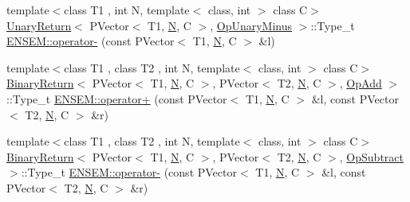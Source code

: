 \begin{DoxyCompactItemize}
\item 
{\footnotesize template$<$class T1 , int N, template$<$ class, int $>$ class C$>$ }\\\mbox{\hyperlink{structUnaryReturn}{Unary\+Return}}$<$ P\+Vector$<$ T1, \mbox{\hyperlink{adat__devel_2lib_2hadron_2operator__name__util_8cc_a7722c8ecbb62d99aee7ce68b1752f337}{N}}, C $>$, \mbox{\hyperlink{structOpUnaryMinus}{Op\+Unary\+Minus}} $>$\+::Type\+\_\+t \mbox{\hyperlink{group__primvector_ga7f5358cd7aff24dea49436228e259ade}{E\+N\+S\+E\+M\+::operator-\/}} (const P\+Vector$<$ T1, \mbox{\hyperlink{adat__devel_2lib_2hadron_2operator__name__util_8cc_a7722c8ecbb62d99aee7ce68b1752f337}{N}}, C $>$ \&l)
\item 
{\footnotesize template$<$class T1 , class T2 , int N, template$<$ class, int $>$ class C$>$ }\\\mbox{\hyperlink{structBinaryReturn}{Binary\+Return}}$<$ P\+Vector$<$ T1, \mbox{\hyperlink{adat__devel_2lib_2hadron_2operator__name__util_8cc_a7722c8ecbb62d99aee7ce68b1752f337}{N}}, C $>$, P\+Vector$<$ T2, \mbox{\hyperlink{adat__devel_2lib_2hadron_2operator__name__util_8cc_a7722c8ecbb62d99aee7ce68b1752f337}{N}}, C $>$, \mbox{\hyperlink{structOpAdd}{Op\+Add}} $>$\+::Type\+\_\+t \mbox{\hyperlink{group__primvector_gaec1b75dc112e9c2300475f1dddbff722}{E\+N\+S\+E\+M\+::operator+}} (const P\+Vector$<$ T1, \mbox{\hyperlink{adat__devel_2lib_2hadron_2operator__name__util_8cc_a7722c8ecbb62d99aee7ce68b1752f337}{N}}, C $>$ \&l, const P\+Vector$<$ T2, \mbox{\hyperlink{adat__devel_2lib_2hadron_2operator__name__util_8cc_a7722c8ecbb62d99aee7ce68b1752f337}{N}}, C $>$ \&r)
\item 
{\footnotesize template$<$class T1 , class T2 , int N, template$<$ class, int $>$ class C$>$ }\\\mbox{\hyperlink{structBinaryReturn}{Binary\+Return}}$<$ P\+Vector$<$ T1, \mbox{\hyperlink{adat__devel_2lib_2hadron_2operator__name__util_8cc_a7722c8ecbb62d99aee7ce68b1752f337}{N}}, C $>$, P\+Vector$<$ T2, \mbox{\hyperlink{adat__devel_2lib_2hadron_2operator__name__util_8cc_a7722c8ecbb62d99aee7ce68b1752f337}{N}}, C $>$, \mbox{\hyperlink{structOpSubtract}{Op\+Subtract}} $>$\+::Type\+\_\+t \mbox{\hyperlink{group__primvector_ga88c10d1dc134a68481b630e96762938a}{E\+N\+S\+E\+M\+::operator-\/}} (const P\+Vector$<$ T1, \mbox{\hyperlink{adat__devel_2lib_2hadron_2operator__name__util_8cc_a7722c8ecbb62d99aee7ce68b1752f337}{N}}, C $>$ \&l, const P\+Vector$<$ T2, \mbox{\hyperlink{adat__devel_2lib_2hadron_2operator__name__util_8cc_a7722c8ecbb62d99aee7ce68b1752f337}{N}}, C $>$ \&r)
\item 

\end{DoxyCompactItemize}
